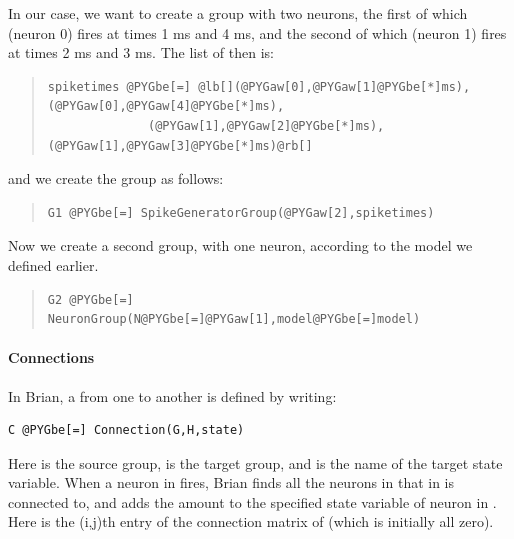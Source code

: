 \documentclass[letterpaper,10pt]{manual}
\begin{document}
In our case, we want to create a group with two neurons, the first
of which (neuron 0) fires at times 1 ms and 4 ms, and the second
of which (neuron 1) fires at times 2 ms and 3 ms. The list of
 then is:
\begin{quote}

\begin{Verbatim}[commandchars=@\[\]]
spiketimes @PYGbe[=] @lb[](@PYGaw[0],@PYGaw[1]@PYGbe[*]ms), (@PYGaw[0],@PYGaw[4]@PYGbe[*]ms),
              (@PYGaw[1],@PYGaw[2]@PYGbe[*]ms), (@PYGaw[1],@PYGaw[3]@PYGbe[*]ms)@rb[]
\end{Verbatim}
\end{quote}

and we create the group as follows:
\begin{quote}

\begin{Verbatim}[commandchars=@\[\]]
G1 @PYGbe[=] SpikeGeneratorGroup(@PYGaw[2],spiketimes)
\end{Verbatim}
\end{quote}

Now we create a second group, with one neuron, according to the
model we defined earlier.
\begin{quote}

\begin{Verbatim}[commandchars=@\[\]]
G2 @PYGbe[=] NeuronGroup(N@PYGbe[=]@PYGaw[1],model@PYGbe[=]model)
\end{Verbatim}
\end{quote}


\paragraph{Connections}

In Brian, a \hyperlink{brian.Connection}{} from one \hyperlink{brian.NeuronGroup}{} to another is
defined by writing:

\begin{Verbatim}[commandchars=@\[\]]
C @PYGbe[=] Connection(G,H,state)
\end{Verbatim}

Here  is the source group,  is the target group, and  is the
name of the target state variable. When a neuron  in  fires, Brian
finds all the neurons  in  that  in  is connected to, and adds
the amount  to the specified state variable of neuron  in .
Here  is the (i,j)th entry of the connection matrix of  (which
is initially all zero).
\end{document}

